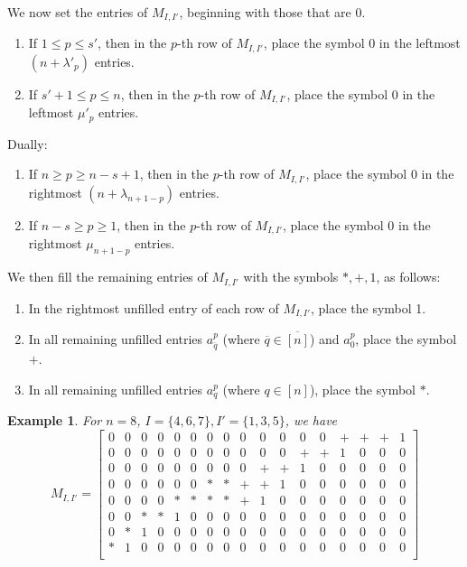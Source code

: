 \documentclass[12pt]{amsart}
\newtheorem{example}[definition]{Example}
\newcommand{\barq}{\overline{q}}
\begin{document}
We now set the entries of $M_{I,I'}$, beginning with those that are 0.
\begin{enumerate}
    \item[(1)] If $1 \le p \le s'$, then in the $p$-th row of $M_{I,I'}$, place the symbol 0 in the leftmost $(n+\lambda'_p)$ entries.
    \item[(2)] If $s'+1\le p \le n$, then in the $p$-th row of $M_{I,I'}$, place the symbol 0 in the leftmost $\mu'_p$ entries.
\end{enumerate}
Dually:
\begin{enumerate}
    \item[(3)] If $n \ge p \ge n-s+1$, then in the $p$-th row of $M_{I,I'}$, place the symbol 0 in the rightmost $(n+\lambda_{n+1-p})$ entries.
    \item[(4)] If $n-s\ge p \ge 1$, then in the $p$-th row of $M_{I,I'}$, place the symbol 0 in the rightmost $\mu_{n+1-p}$ entries.
\end{enumerate}
We then fill the remaining entries of $M_{I,I'}$ with the symbols $*,+,1$, as follows:
\begin{enumerate}
    \item[(5)] In the rightmost unfilled entry of each row of $M_{I,I'}$, place the symbol 1.
    \item[(6)] In all remaining unfilled entries $a^p_{\barq}$ (where $\barq\in\overline{[n]}$) and $a^p_0$, place the symbol $+$.
    \item[(7)] In all remaining unfilled entries $a^p_q$ (where $q\in[n]$), place the symbol $*$.
\end{enumerate}



\begin{example}\label{eg:MII'}
    For $n = 8$, $I = \{4,6,7\}, I' = \{1,3,5\}$, we have
        \begin{equation*}
        M_{I,I'}=
        \begin{bmatrix}
            0 & 0 & 0 & 0 & 0 & 0 & 0 & 0 & 0 & 0 & 0 & 0 & 0 & + & + & + & 1 \\
            0 & 0 & 0 & 0 & 0 & 0 & 0 & 0 & 0 & 0 & 0 & + & + & 1 & 0 & 0 & 0 \\
            0 & 0 & 0 & 0 & 0 & 0 & 0 & 0 & 0 & + & + & 1 & 0 & 0 & 0 & 0 & 0 \\
            0 & 0 & 0 & 0 & 0 & 0 & * & * & + & + & 1 & 0 & 0 & 0 & 0 & 0 & 0 \\
            0 & 0 & 0 & 0 & * & * & * & * & + & 1 & 0 & 0 & 0 & 0 & 0 & 0 & 0 \\
            0 & 0 & * & * & 1 & 0 & 0 & 0 & 0 & 0 & 0 & 0 & 0 & 0 & 0 & 0 & 0 \\
            0 & * & 1 & 0 & 0 & 0 & 0 & 0 & 0 & 0 & 0 & 0 & 0 & 0 & 0 & 0 & 0 \\
            * & 1 & 0 & 0 & 0 & 0 & 0 & 0 & 0 & 0 & 0 & 0 & 0 & 0 & 0 & 0 & 0 \\
        \end{bmatrix}
    \end{equation*}
\end{example}
\end{document}
